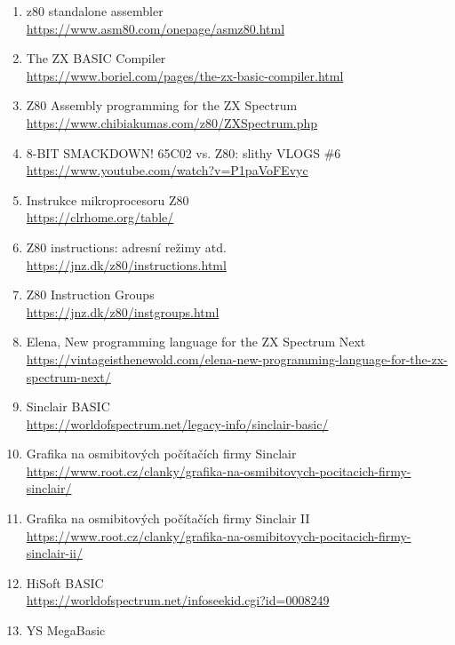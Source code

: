 \documentclass{article}
\providecommand{\tightlist}{%
    \setlength{\itemsep}{0pt}\setlength{\parskip}{0pt}}
\begin{document}
\begin{enumerate}
\tightlist
\item
  z80 standalone assembler\\
  \href{https://www.asm80.com/onepage/asmz80.html}{https://www.asm80.com/one­page/asmz80.html}
\item
  The ZX BASIC Compiler\\
  \url{https://www.boriel.com/pages/the-zx-basic-compiler.html}
\item
  Z80 Assembly programming for the ZX Spectrum\\
  \href{https://www.chibiakumas.com/z80/ZXSpectrum.php}{https://www.chibiakumas.com/z80/ZXSpec­trum.php}
\item
  8-BIT SMACKDOWN! 65C02 vs. Z80: slithy VLOGS \#6\\
  \href{https://www.youtube.com/watch?v=P1paVoFEvyc}{https://www.youtube.com/wat­ch?v=P1paVoFEvyc}
\item
  Instrukce mikroprocesoru Z80\\
  \url{https://clrhome.org/table/}
\item
  Z80 instructions: adresní režimy atd.\\
  \url{https://jnz.dk/z80/instructions.html}
\item
  Z80 Instruction Groups\\
  \url{https://jnz.dk/z80/instgroups.html}
\item
  Elena, New programming language for the ZX Spectrum Next\\
  \url{https://vintageisthenewold.com/elena-new-programming-language-for-the-zx-spectrum-next/}
\item
  Sinclair BASIC\\
  \url{https://worldofspectrum.net/legacy-info/sinclair-basic/}
\item
  Grafika na osmibitových počítačích firmy Sinclair\\
  \url{https://www.root.cz/clanky/grafika-na-osmibitovych-pocitacich-firmy-sinclair/}
\item
  Grafika na osmibitových počítačích firmy Sinclair II\\
  \url{https://www.root.cz/clanky/grafika-na-osmibitovych-pocitacich-firmy-sinclair-ii/}
\item
  HiSoft BASIC\\
  \href{https://worldofspectrum.net/infoseekid.cgi?id=0008249}{https://worldofspectrum.net/in­foseekid.cgi?id=0008249}
\item
  YS MegaBasic\\

\end{enumerate}
\end{document}
